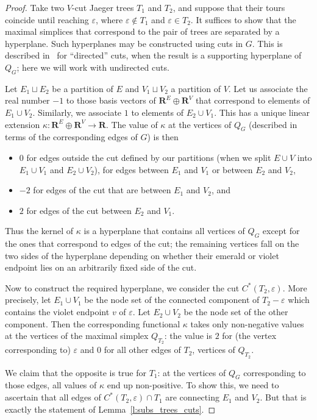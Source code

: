 \documentclass[10pt]{amsart}
\theoremstyle{definition}\newtheorem{defi}[theo]{Definition}
\theoremstyle{remark}\newtheorem{rema}[theo]{Remark}
\newcommand{\R}{\mathbf{R}}
\begin{document}
\begin{proof}
	Take two $V$-cut Jaeger trees $T_1$ and $T_2$, and suppose that their tours coincide until reaching $\varepsilon$, where $\varepsilon\notin T_1$ and $\varepsilon\in T_2$. It suffices to show that the maximal simplices that correspond to the pair of trees are separated by a hyperplane. Such hyperplanes may be constructed using cuts in $G$. This is described in~\cite[Section~3]{KP_Ehrhart} for ``directed'' cuts, when the result is a supporting hyperplane of $Q_G$; here we will work with undirected cuts.
	
	Let $E_1\sqcup E_2$ be a partition of $E$ and $V_1\sqcup V_2$ a partition of $V$. Let us associate the real number $-1$ to those basis vectors of $\R^E\oplus\R^V$ that correspond to elements of $E_1\cup V_2$. Similarly, we associate $1$ to elements of $E_2\cup V_1$. This has a unique linear extension $\kappa\colon\R^E\oplus\R^V\to\R$. The value of $\kappa$ at the vertices of $Q_G$ (described in terms of the corresponding edges of $G$) is then
	\begin{itemize}
		\item $0$ for edges outside the cut defined by our partitions (when we split $E\cup V$ into $E_1\cup V_1$ and $E_2\cup V_2$), \ie for edges between $E_1$ and $V_1$ or between $E_2$ and $V_2$,
		\item $-2$ for edges of the cut that are between $E_1$ and $V_2$, and
		\item $2$ for edges of the cut between $E_2$ and $V_1$.
	\end{itemize}
	Thus the kernel of $\kappa$ is a hyperplane that contains all vertices of $Q_G$ except for the ones that correspond to edges of the cut; the remaining vertices fall on the two sides of the hyperplane depending on whether their emerald or violet endpoint lies on an arbitrarily fixed side of the cut.
	
	Now to construct the required hyperplane, we consider the cut $C^*(T_2,\varepsilon)$. More precisely, let $E_1\cup V_1$ be the node set of the connected component of $T_2-\varepsilon$ which contains the violet endpoint $v$ of $\varepsilon$. Let $E_2\cup V_2$ be the node set of the other component. Then the corresponding functional $\kappa$ takes only non-negative values at the vertices of the maximal simplex $Q_{T_2}$: the value is $2$ for (the vertex corresponding to) $\varepsilon$ and $0$ for all other edges of $T_2$, \ie vertices of $Q_{T_2}$. 
	
	We claim that the opposite is true for $T_1$: at the vertices of $Q_G$ corresponding to those edges, all values of $\kappa$ end up non-positive. To show this, we need to ascertain that all edges of $C^*(T_2,\varepsilon)\cap T_1$ are connecting $E_1$ and $V_2$. But that is exactly the statement of Lemma~\ref{l:subs_trees_cuts}. 
\end{proof}
\end{document}
